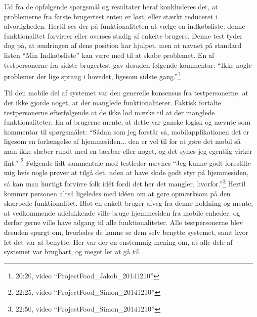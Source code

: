 Ud fra de opfølgende spørgsmål og resultater heraf konkluderes det, at problemerne fra første brugertest enten er løst, eller stærkt reduceret i alvorligheden.
Hertil ses der på funktionaliteten at vælge en indkøbsliste, denne funktionalitet forvirrer eller overses stadig af enkelte brugere. 
Denne test tyder dog på, at ændringen af dens position har hjulpet, men at navnet på standard listen ``Min Indkøbsliste'' kan være med til at skabe problemet.
En af testpersonerne fra sidste brugertest gav desuden følgende kommentar: ``Ikke nogle problemer der lige sprang i hovedet, ligesom sidste gang.''\footnote{20:20, video ``ProjectFood\_Jakob\_20141210''}

Til den mobile del af systemet var den generelle konsensus fra testpersonerne, at det ikke gjorde noget, at der manglede funktionaliteter.
Faktisk fortalte testpersonerne efterfølgende at de ikke lod mærke til at der manglede funktionaliteter. 
En af brugerne mente, at dette var ganske logisk og nævnte som kommentar til spørgsmålet: ``Sådan som jeg forstår så, mobilapplikationen det er ligesom en forlængelse af hjemmesiden... den er vel til for at gøre det mobil så man ikke slæber rundt med en bærbar eller noget, og det synes jeg egentlig virker fint.'' \footnote{22:25, video ``ProjectFood\_Simon\_20141210''}
Følgende lidt sammentale med testleder nævnes ``Jeg kunne godt forestille mig hvis nogle prøver at tilgå det, uden at have skide godt styr på hjemmesiden, så kan man hurtigt forvirre folk idét fordi det her det mangler, hvorfor.''\footnote{22:50, video ``ProjectFood\_Simon\_20141210''}
Hertil kommer personen altså ligeledes med idéen om at gøre opmærksom på den skærpede funktionalitet.
Blot en enkelt bruger afveg fra denne holdning og mente, at vedkommende udelukkende ville bruge hjemmesiden fra mobile enheder, og derfor gerne ville have adgang til alle funktionaliteter.
Alle testpersonerne blev desuden spurgt om, hvorledes de kunne se dem selv benytte systemet, samt hvor let det var at benytte.
Her var der en enstemmig mening om, at alle dele af systemet var brugbart, og meget let at gå til.
